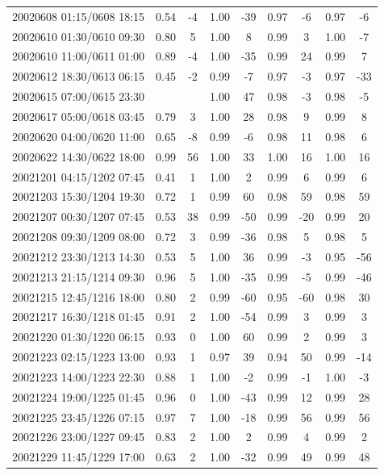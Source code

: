 \documentclass[linenumbers,draft]{agujournal}
\begin{document}
\begin{center}
\begin{longtable}{c||cc|cc|cc|cc}
20020608 01:15/0608 18:15 & 0.54 & -4 & 1.00 & -39 & 0.97 & -6 & 0.97 & -6 \\
20020610 01:30/0610 09:30 & 0.80 & 5 & 1.00 & 8 & 0.99 & 3 & 1.00 & -7 \\
20020610 11:00/0611 01:00 & 0.89 & -4 & 1.00 & -35 & 0.99 & 24 & 0.99 & 7 \\
20020612 18:30/0613 06:15 & 0.45 & -2 & 0.99 & -7 & 0.97 & -3 & 0.97 & -33 \\
20020615 07:00/0615 23:30 & & & 1.00 & 47 & 0.98 & -3 & 0.98 & -5 \\
20020617 05:00/0618 03:45 & 0.79 & 3 & 1.00 & 28 & 0.98 & 9 & 0.99 & 8 \\
20020620 04:00/0620 11:00 & 0.65 & -8 & 0.99 & -6 & 0.98 & 11 & 0.98 & 6 \\
20020622 14:30/0622 18:00 & 0.99 & 56 & 1.00 & 33 & 1.00 & 16 & 1.00 & 16 \\
20021201 04:15/1202 07:45 & 0.41 & 1 & 1.00 & 2 & 0.99 & 6 & 0.99 & 6 \\
20021203 15:30/1204 19:30 & 0.72 & 1 & 0.99 & 60 & 0.98 & 59 & 0.98 & 59 \\
20021207 00:30/1207 07:45 & 0.53 & 38 & 0.99 & -50 & 0.99 & -20 & 0.99 & 20 \\
20021208 09:30/1209 08:00 & 0.72 & 3 & 0.99 & -36 & 0.98 & 5 & 0.98 & 5 \\
20021212 23:30/1213 14:30 & 0.53 & 5 & 1.00 & 36 & 0.99 & -3 & 0.95 & -56 \\
20021213 21:15/1214 09:30 & 0.96 & 5 & 1.00 & -35 & 0.99 & -5 & 0.99 & -46 \\
20021215 12:45/1216 18:00 & 0.80 & 2 & 0.99 & -60 & 0.95 & -60 & 0.98 & 30 \\
20021217 16:30/1218 01:45 & 0.91 & 2 & 1.00 & -54 & 0.99 & 3 & 0.99 & 3 \\
20021220 01:30/1220 06:15 & 0.93 & 0 & 1.00 & 60 & 0.99 & 2 & 0.99 & 3 \\
20021223 02:15/1223 13:00 & 0.93 & 1 & 0.97 & 39 & 0.94 & 50 & 0.99 & -14 \\
20021223 14:00/1223 22:30 & 0.88 & 1 & 1.00 & -2 & 0.99 & -1 & 1.00 & -3 \\
20021224 19:00/1225 01:45 & 0.96 & 0 & 1.00 & -43 & 0.99 & 12 & 0.99 & 28 \\
20021225 23:45/1226 07:15 & 0.97 & 7 & 1.00 & -18 & 0.99 & 56 & 0.99 & 56 \\
20021226 23:00/1227 09:45 & 0.83 & 2 & 1.00 & 2 & 0.99 & 4 & 0.99 & 2 \\
20021229 11:45/1229 17:00 & 0.63 & 2 & 1.00 & -32 & 0.99 & 49 & 0.99 & 48 \\

\end{longtable}
\end{center}
\end{document}
